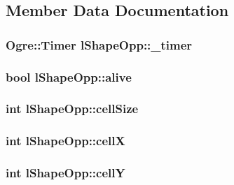 \subsection{Member Data Documentation}
\hypertarget{classl_shape_opp_abd9743d641bc2d4d7288a032021bbba3}{
\subsubsection[{\-\_\-timer}]{\setlength{\rightskip}{0pt plus 5cm}Ogre\-::\-Timer l\-Shape\-Opp\-::\-\_\-timer}}\label{classl_shape_opp_abd9743d641bc2d4d7288a032021bbba3}
\hypertarget{classl_shape_opp_a4ddddfd93dd1c10f0d6681cce2adbf3f}{
\subsubsection[{alive}]{\setlength{\rightskip}{0pt plus 5cm}bool l\-Shape\-Opp\-::alive}}\label{classl_shape_opp_a4ddddfd93dd1c10f0d6681cce2adbf3f}
\hypertarget{classl_shape_opp_a004f76632d9012218835d49fb6e5e7a2}{
\subsubsection[{cell\-Size}]{\setlength{\rightskip}{0pt plus 5cm}int l\-Shape\-Opp\-::cell\-Size}}\label{classl_shape_opp_a004f76632d9012218835d49fb6e5e7a2}
\hypertarget{classl_shape_opp_a68f2d97b3f79fc3f942f08ffb925ab04}{
\subsubsection[{cell\-X}]{\setlength{\rightskip}{0pt plus 5cm}int l\-Shape\-Opp\-::cell\-X}}\label{classl_shape_opp_a68f2d97b3f79fc3f942f08ffb925ab04}
\hypertarget{classl_shape_opp_a45d07e647c16b8c13e03bbe72011487c}{
\subsubsection[{cell\-Y}]{\setlength{\rightskip}{0pt plus 5cm}int l\-Shape\-Opp\-::cell\-Y}}\label{classl_shape_opp_a45d07e647c16b8c13e03bbe72011487c}

